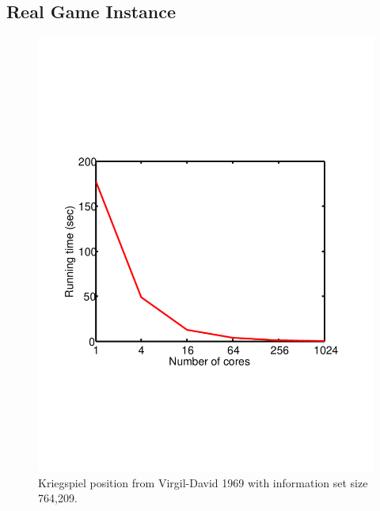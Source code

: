 \documentclass[times, 10pt,twocolumn]{article}
\begin{document}
\subsection{Real Game Instance}
\begin{figure}[ht]
 \centering \includegraphics[viewport= 280 200 300 550, scale=0.35]{images/KriegspielProblem4.pdf} %
\caption{Kriegspiel position from Virgil-David 1969 with information set size 764,209.}
\label{prob4} 
\vspace{-0.2in}
\end{figure}
\end{document}
